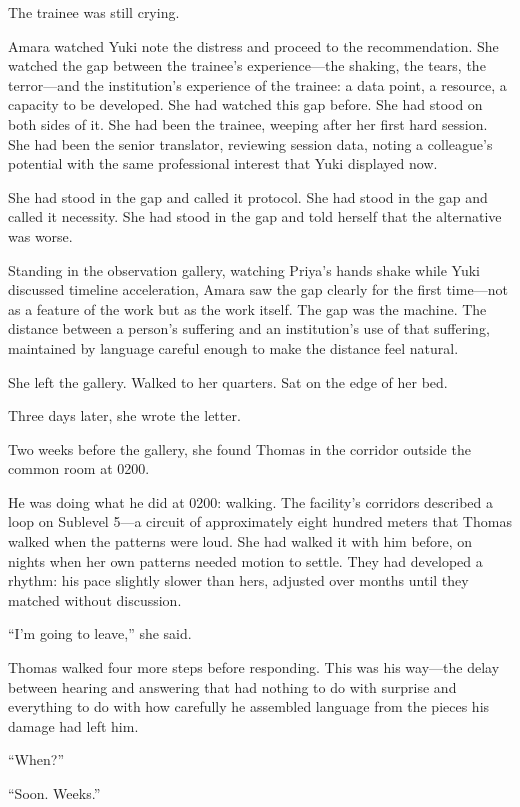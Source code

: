 The trainee was still crying.

Amara watched Yuki note the distress and proceed to the recommendation. She watched the gap between the trainee's experience---the shaking, the tears, the terror---and the institution's experience of the trainee: a data point, a resource, a capacity to be developed. She had watched this gap before. She had stood on both sides of it. She had been the trainee, weeping after her first hard session. She had been the senior translator, reviewing session data, noting a colleague's potential with the same professional interest that Yuki displayed now.

She had stood in the gap and called it protocol. She had stood in the gap and called it necessity. She had stood in the gap and told herself that the alternative was worse.

Standing in the observation gallery, watching Priya's hands shake while Yuki discussed timeline acceleration, Amara saw the gap clearly for the first time---not as a feature of the work but as the work itself. The gap was the machine. The distance between a person's suffering and an institution's use of that suffering, maintained by language careful enough to make the distance feel natural.

She left the gallery. Walked to her quarters. Sat on the edge of her bed.

Three days later, she wrote the letter.

\scenebreak

Two weeks before the gallery, she found Thomas in the corridor outside the common room at 0200.

He was doing what he did at 0200: walking. The facility's corridors described a loop on Sublevel 5---a circuit of approximately eight hundred meters that Thomas walked when the patterns were loud. She had walked it with him before, on nights when her own patterns needed motion to settle. They had developed a rhythm: his pace slightly slower than hers, adjusted over months until they matched without discussion.

``I'm going to leave,'' she said.

Thomas walked four more steps before responding. This was his way---the delay between hearing and answering that had nothing to do with surprise and everything to do with how carefully he assembled language from the pieces his damage had left him.

``When?''

``Soon. Weeks.''

